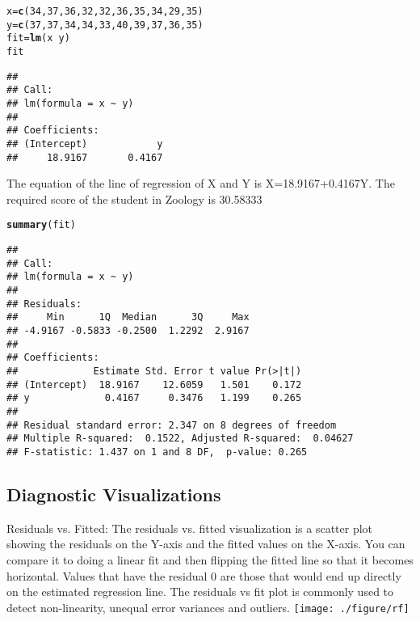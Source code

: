 \documentclass{article}\usepackage[]{graphicx}\usepackage[]{xcolor}
\makeatletter
\newcommand{\hlnum}[1]{\textcolor[rgb]{0.686,0.059,0.569}{#1}}%
\newcommand{\hlopt}[1]{\textcolor[rgb]{0,0,0}{#1}}%
\newcommand{\hldef}[1]{\textcolor[rgb]{0.345,0.345,0.345}{#1}}%
\newcommand{\hlkwb}[1]{\textcolor[rgb]{0.69,0.353,0.396}{#1}}%
\newcommand{\hlkwd}[1]{\textcolor[rgb]{0.737,0.353,0.396}{\textbf{#1}}}%
\newenvironment{kframe}{%
 \def\at@end@of@kframe{}%
 \ifinner\ifhmode%
  \def\at@end@of@kframe{\end{minipage}}%
  \begin{minipage}{\columnwidth}%
 \fi\fi%
 \def\FrameCommand##1{\hskip\@totalleftmargin \hskip-\fboxsep
 \colorbox{shadecolor}{##1}\hskip-\fboxsep
     \hskip-\linewidth \hskip-\@totalleftmargin \hskip\columnwidth}%
 \MakeFramed {\advance\hsize-\width
   \@totalleftmargin\z@ \linewidth\hsize
   \@setminipage}}%
 {\par\unskip\endMakeFramed%
 \at@end@of@kframe}
\newenvironment{knitrout}{}{} %
\makeatother
\begin{document}
\begin{knitrout}
\color{fgcolor}\begin{kframe}
\begin{alltt}
\hldef{x}\hlkwb{=}\hlkwd{c}\hldef{(}\hlnum{34}\hldef{,}\hlnum{37}\hldef{,}\hlnum{36}\hldef{,}\hlnum{32}\hldef{,}\hlnum{32}\hldef{,}\hlnum{36}\hldef{,}\hlnum{35}\hldef{,}\hlnum{34}\hldef{,}\hlnum{29}\hldef{,}\hlnum{35}\hldef{)}
\hldef{y}\hlkwb{=}\hlkwd{c}\hldef{(}\hlnum{37}\hldef{,}\hlnum{37}\hldef{,}\hlnum{34}\hldef{,}\hlnum{34}\hldef{,}\hlnum{33}\hldef{,}\hlnum{40}\hldef{,}\hlnum{39}\hldef{,}\hlnum{37}\hldef{,}\hlnum{36}\hldef{,}\hlnum{35}\hldef{)}
\hldef{fit}\hlkwb{=}\hlkwd{lm}\hldef{(x}\hlopt{~}\hldef{y)}
\hldef{fit}
\end{alltt}
\begin{verbatim}
## 
## Call:
## lm(formula = x ~ y)
## 
## Coefficients:
## (Intercept)            y  
##     18.9167       0.4167
\end{verbatim}
\end{kframe}
\end{knitrout}
The equation of the line of regression of X and Y is X=18.9167+0.4167Y.
The required score of the student in Zoology is 30.58333
\begin{knitrout}
\color{fgcolor}\begin{kframe}
\begin{alltt}
\hlkwd{summary}\hldef{(fit)}
\end{alltt}
\begin{verbatim}
## 
## Call:
## lm(formula = x ~ y)
## 
## Residuals:
##     Min      1Q  Median      3Q     Max 
## -4.9167 -0.5833 -0.2500  1.2292  2.9167 
## 
## Coefficients:
##             Estimate Std. Error t value Pr(>|t|)
## (Intercept)  18.9167    12.6059   1.501    0.172
## y             0.4167     0.3476   1.199    0.265
## 
## Residual standard error: 2.347 on 8 degrees of freedom
## Multiple R-squared:  0.1522,	Adjusted R-squared:  0.04627 
## F-statistic: 1.437 on 1 and 8 DF,  p-value: 0.265
\end{verbatim}
\end{kframe}
\end{knitrout}

\subsection{Diagnostic Visualizations}
Residuals vs. Fitted:
The residuals vs. fitted visualization is a scatter plot showing the residuals on the Y-axis and the fitted values on the X-axis. You can compare it to doing a linear fit and then flipping the fitted line so that it becomes horizontal. Values that have the residual 0 are those that would end up directly on the estimated regression line. The residuals vs fit plot is commonly used to detect non-linearity, unequal error variances and outliers.
\texttt{[image: ./figure/rf]}
\end{document}

